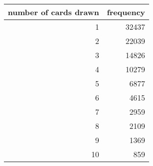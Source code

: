 \begin{tabular}{rr}
  \hline
  \textbf{number of cards drawn} & \textbf{frequency} \\\hline
  1 & 32437 \\
  2 & 22039 \\
  3 & 14826 \\
  4 & 10279 \\
  5 & 6877 \\
  6 & 4615 \\
  7 & 2959 \\
  8 & 2109 \\
  9 & 1369 \\
  10 & 859 \\\hline
\end{tabular}

